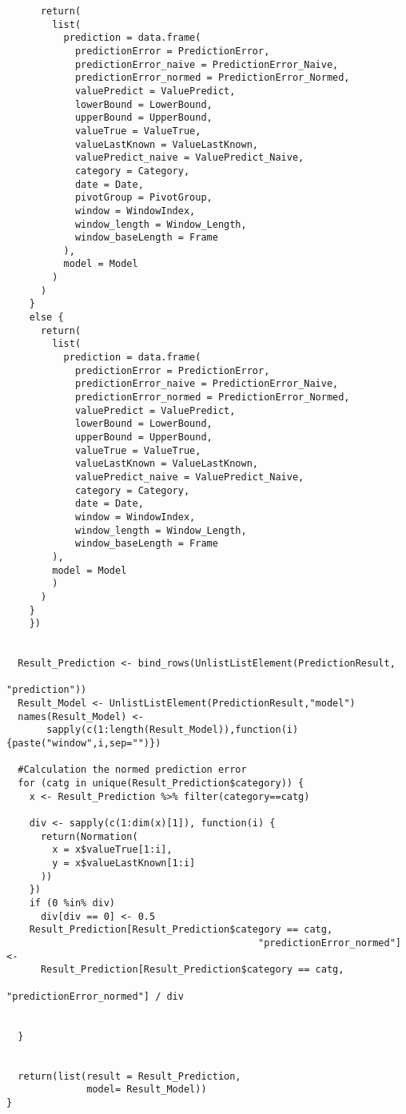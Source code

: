 \begin{verbatim}
      return(
        list(
          prediction = data.frame(
            predictionError = PredictionError,
            predictionError_naive = PredictionError_Naive,
            predictionError_normed = PredictionError_Normed,
            valuePredict = ValuePredict,
            lowerBound = LowerBound,
            upperBound = UpperBound,
            valueTrue = ValueTrue,
            valueLastKnown = ValueLastKnown,
            valuePredict_naive = ValuePredict_Naive,
            category = Category,
            date = Date,
            pivotGroup = PivotGroup,
            window = WindowIndex,
            window_length = Window_Length,
            window_baseLength = Frame
          ),
          model = Model
        )
      )
    } 
    else {
      return(
        list(
          prediction = data.frame(
            predictionError = PredictionError,
            predictionError_naive = PredictionError_Naive,
            predictionError_normed = PredictionError_Normed,
            valuePredict = ValuePredict,
            lowerBound = LowerBound,
            upperBound = UpperBound,
            valueTrue = ValueTrue,
            valueLastKnown = ValueLastKnown,
            valuePredict_naive = ValuePredict_Naive,
            category = Category,
            date = Date,
            window = WindowIndex,
            window_length = Window_Length,
            window_baseLength = Frame
        ),
        model = Model
        )
      )
    }
    })
  
  
  Result_Prediction <- bind_rows(UnlistListElement(PredictionResult,
																									 "prediction"))
  Result_Model <- UnlistListElement(PredictionResult,"model")
  names(Result_Model) <- 
	   sapply(c(1:length(Result_Model)),function(i){paste("window",i,sep="")})
  
  #Calculation the normed prediction error
  for (catg in unique(Result_Prediction$category)) {
    x <- Result_Prediction %>% filter(category==catg)
    
    div <- sapply(c(1:dim(x)[1]), function(i) {
      return(Normation(
        x = x$valueTrue[1:i],
        y = x$valueLastKnown[1:i]
      ))
    })
    if (0 %in% div)
      div[div == 0] <- 0.5
    Result_Prediction[Result_Prediction$category == catg, 
											"predictionError_normed"] <-
      Result_Prediction[Result_Prediction$category == catg, 
												"predictionError_normed"] / div
    
    
  }
  
  
  return(list(result = Result_Prediction,
              model= Result_Model))
}
\end{verbatim}

